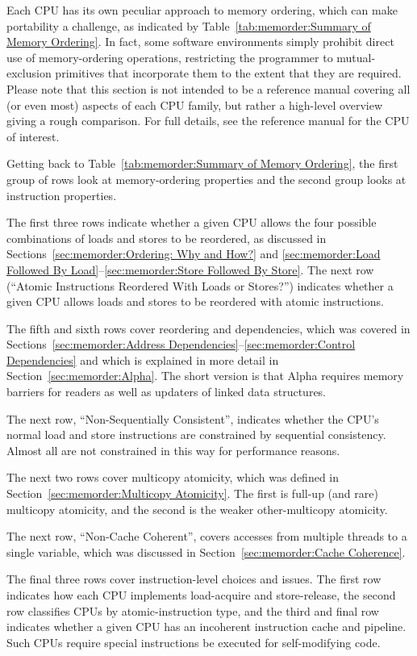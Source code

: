 Each CPU has its own peculiar approach to memory ordering, which
can make portability a challenge, as indicated by
Table~\ref{tab:memorder:Summary of Memory Ordering}.
In fact, some software environments simply prohibit
direct use of memory-ordering operations, restricting the programmer
to mutual-exclusion primitives that incorporate them to the extent that
they are required.  Please note that this section is not intended to be
a reference manual
covering all (or even most) aspects of each CPU family, but rather
a high-level overview giving a rough comparison.
For full details, see the reference manual for the CPU of interest.

Getting back to
Table~\ref{tab:memorder:Summary of Memory Ordering},
the first group of rows look at memory-ordering
properties and the second group looks at instruction properties.

The first three rows indicate whether a given CPU allows the four
possible combinations of loads and stores to be reordered, as discussed
in
Sections~\ref{sec:memorder:Ordering: Why and How?} and
\ref{sec:memorder:Load Followed By Load}--\ref{sec:memorder:Store Followed By Store}.
The next row (``Atomic Instructions Reordered With Loads or Stores?'')
indicates whether a given CPU allows loads and stores
to be reordered with atomic instructions.

The fifth and sixth rows cover reordering and dependencies,
which was covered in
Sections~\ref{sec:memorder:Address Dependencies}--\ref{sec:memorder:Control Dependencies}
and which is explained in more detail in
Section~\ref{sec:memorder:Alpha}.
The short version is that Alpha requires memory barriers for readers
as well as updaters of linked data structures.

The next row, ``Non-Sequentially Consistent'', indicates whether
the CPU's normal load and store instructions are constrained by
sequential consistency.
Almost all are not constrained in this way for performance reasons.

The next two rows cover multicopy atomicity, which was defined in
Section~\ref{sec:memorder:Multicopy Atomicity}.
The first is full-up (and rare) multicopy atomicity, and the second is the
weaker other-multicopy atomicity.

The next row, ``Non-Cache Coherent'', covers accesses from multiple
threads to a single variable, which was discussed in
Section~\ref{sec:memorder:Cache Coherence}.

The final three rows cover instruction-level choices and issues.
The first row indicates how each CPU implements load-acquire
and store-release, the second row classifies CPUs by atomic-instruction
type, and the third and final row
indicates whether a given CPU has an incoherent
instruction cache and pipeline.
Such CPUs require special instructions be executed for self-modifying
code.

